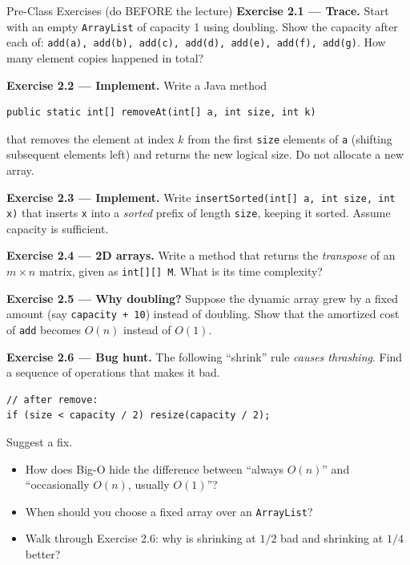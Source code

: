 \documentclass[11pt]{article}
\begin{document}
\begin{exbox}{Pre-Class Exercises (do BEFORE the lecture)}
\textbf{Exercise 2.1 --- Trace.} Start with an empty \texttt{ArrayList} of capacity 1 using doubling. Show the capacity after each of: \texttt{add(a), add(b), add(c), add(d), add(e), add(f), add(g)}. How many element copies happened in total?

\textbf{Exercise 2.2 --- Implement.} Write a Java method
\begin{lstlisting}
public static int[] removeAt(int[] a, int size, int k)
\end{lstlisting}
that removes the element at index $k$ from the first \texttt{size} elements of \texttt{a} (shifting subsequent elements left) and returns the new logical size. Do not allocate a new array.

\textbf{Exercise 2.3 --- Implement.} Write \verb|insertSorted(int[] a, int size, int x)| that inserts \texttt{x} into a \emph{sorted} prefix of length \texttt{size}, keeping it sorted. Assume capacity is sufficient.

\textbf{Exercise 2.4 --- 2D arrays.} Write a method that returns the \emph{transpose} of an $m\times n$ matrix, given as \texttt{int[][] M}. What is its time complexity?

\textbf{Exercise 2.5 --- Why doubling?} Suppose the dynamic array grew by a fixed amount (say \texttt{capacity + 10}) instead of doubling. Show that the amortized cost of \texttt{add} becomes $O(n)$ instead of $O(1)$.

\textbf{Exercise 2.6 --- Bug hunt.} The following ``shrink'' rule \emph{causes thrashing}. Find a sequence of operations that makes it bad.
\begin{lstlisting}
// after remove:
if (size < capacity / 2) resize(capacity / 2);
\end{lstlisting}
Suggest a fix.
\end{exbox}

\begin{disbox}
\begin{itemize}[leftmargin=*]
  \item How does Big-O hide the difference between ``always $O(n)$'' and ``occasionally $O(n)$, usually $O(1)$''?
  \item When should you choose a fixed array over an \texttt{ArrayList}?
  \item Walk through Exercise 2.6: why is shrinking at $1/2$ bad and shrinking at $1/4$ better?
\end{itemize}
\end{disbox}
\end{document}
